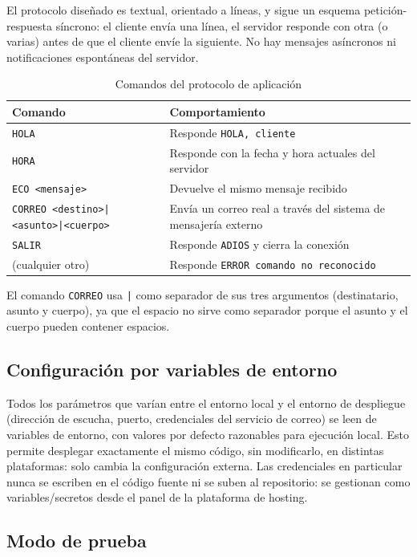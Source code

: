 \documentclass[12pt,a4paper]{article}
\begin{document}
El protocolo diseñado es textual, orientado a líneas, y sigue un esquema petición-respuesta síncrono: el cliente envía una línea, el servidor responde con otra (o varias) antes de que el cliente envíe la siguiente. No hay mensajes asíncronos ni notificaciones espontáneas del servidor.

\begin{table}[H]
\centering
\begin{tabular}{@{}ll@{}}
\toprule
\textbf{Comando} & \textbf{Comportamiento} \\
\midrule
\texttt{HOLA} & Responde \texttt{HOLA, cliente} \\
\texttt{HORA} & Responde con la fecha y hora actuales del servidor \\
\texttt{ECO <mensaje>} & Devuelve el mismo mensaje recibido \\
\texttt{CORREO <destino>|<asunto>|<cuerpo>} & Envía un correo real a través del sistema de mensajería externo \\
\texttt{SALIR} & Responde \texttt{ADIOS} y cierra la conexión \\
(cualquier otro) & Responde \texttt{ERROR comando no reconocido} \\
\bottomrule
\end{tabular}
\caption{Comandos del protocolo de aplicación}
\end{table}

El comando \texttt{CORREO} usa \texttt{|} como separador de sus tres argumentos (destinatario, asunto y cuerpo), ya que el espacio no sirve como separador porque el asunto y el cuerpo pueden contener espacios.

\subsection{Configuración por variables de entorno}

Todos los parámetros que varían entre el entorno local y el entorno de despliegue (dirección de escucha, puerto, credenciales del servicio de correo) se leen de variables de entorno, con valores por defecto razonables para ejecución local. Esto permite desplegar exactamente el mismo código, sin modificarlo, en distintas plataformas: solo cambia la configuración externa. Las credenciales en particular nunca se escriben en el código fuente ni se suben al repositorio: se gestionan como variables/secretos desde el panel de la plataforma de hosting.

\subsection{Modo de prueba}
\end{document}
